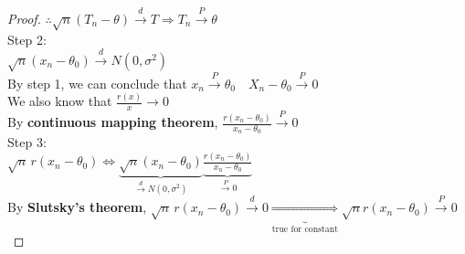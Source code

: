 \begin{proof}
    $\therefore \sqrt{n}(T_n-\theta)\xrightarrow{d}T\Rightarrow T_n\xrightarrow{P}\theta$\\
    Step 2:\\
    $\sqrt{n}(x_n-\theta_0)\xrightarrow{d}N(0,\sigma^2)$\\
    By step 1, we can conclude that $x_n\xrightarrow{P}\theta_0\quad X_n-\theta_0\xrightarrow{P}0$\\
    We also know that $\displaystyle\frac{r(x)}{x}\to 0$\\
    By \textbf{continuous mapping theorem}, $\displaystyle \frac{r(x_n-\theta_0)}{x_n-\theta_0}\xrightarrow{P}0$\\
    Step 3:\\
    $\displaystyle\sqrt{n}\, r(x_n-\theta_0) \Leftrightarrow \underbrace{\sqrt{n}(x_n-\theta_0)}_{\xrightarrow{d}N(0,\sigma^2)}\underbrace{\frac{r(x_n-\theta_0)}{x_n-\theta_0}}_{\xrightarrow{P}0}$\\
    By \textbf{Slutsky's theorem}, 
    $\displaystyle\sqrt{n}\,r(x_n-\theta_0)\xrightarrow{d}0\underbrace{\Rightarrow}_{\text{true for constant}}\sqrt{n}r(x_n-\theta_0)\xrightarrow{P}0$
\end{proof}

